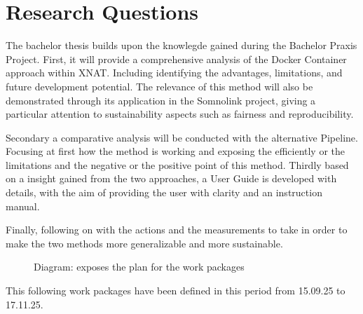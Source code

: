 \section{Research Questions}
The bachelor thesis builds upon the knowlegde gained during the Bachelor Praxis Project.
 First, it will provide a comprehensive analysis of the Docker Container approach within XNAT. Including identifying the advantages, limitations, and future development potential. The relevance of this method will also be demonstrated through its application in the Somnolink project, giving a particular attention to sustainability aspects such as fairness and reproducibility. 

Secondary a comparative analysis will be conducted with the alternative Pipeline. Focusing at first how the method is working and exposing the efficiently or the limitations and the negative or the positive point of this method. 
Thirdly based on a insight gained from the two approaches, a User Guide is developed with details, with the aim of providing the user with clarity and an instruction manual.

Finally, following on with the actions and the measurements to take in order to make the two methods more generalizable and more sustainable.

\begin{figure}[H]
  \centering
  \def\svgwidth{1.1\linewidth}
  
  \caption{Diagram: exposes the plan for the work packages}
  \label{fig:diagram-core-libraries}
\end{figure}

This following work packages have been defined in this period from 15.09.25 to 17.11.25.
